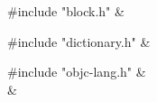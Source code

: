\medskip
\begin{cxreftabi}
{\stt \#include "block.h"} &\\
\end{cxreftabi}

\medskip
\begin{cxreftabi}
{\stt \#include "dictionary.h"} &\\
\end{cxreftabi}

\medskip
\begin{cxreftabi}
{\stt \#include "objc-lang.h"} &\\
\hspace*{0.2in}{\stt \#include <Availability.h>} &\\
\end{cxreftabi}

